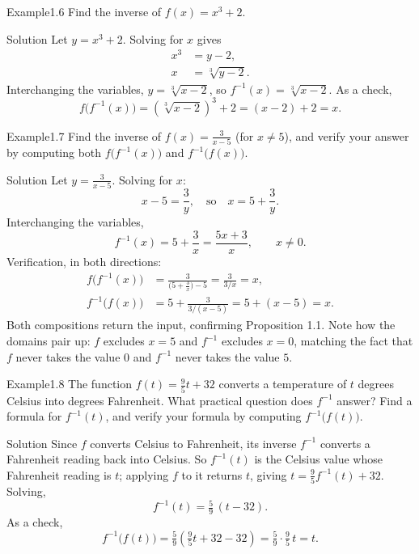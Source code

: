 \documentclass[a4paper,12pt,oneside]{memoir}
\begin{document}
\begin{workedexample}
\begin{envexample}{Example}{1.6}{}
Find the inverse of \(f(x) = x^{3} + 2\).
\end{envexample}
\begin{envsolution}{Solution}{}{}
Let \(y = x^{3} + 2\). Solving for \(x\) gives \[ \begin{aligned} x^{3} &= y - 2,\\ x &= \sqrt[3]{y - 2}. \end{aligned} \] Interchanging the variables, \(y = \sqrt[3]{x - 2}\), so \(f^{-1}(x) = \sqrt[3]{x - 2}\). As a check, \[ f\!\bigl(f^{-1}(x)\bigr) = \left(\sqrt[3]{x - 2}\right)^{3} + 2 = (x - 2) + 2 = x. \]
\end{envsolution}
\end{workedexample}
\begin{workedexample}
\begin{envexample}{Example}{1.7}{}
Find the inverse of \(f(x) = \frac{3}{x - 5}\) (for \(x \neq 5\)), and verify your answer by computing both \(f\!\bigl(f^{-1}(x)\bigr)\) and \(f^{-1}\!\bigl(f(x)\bigr)\).
\end{envexample}
\begin{envsolution}{Solution}{}{}
Let \(y = \frac{3}{x - 5}\). Solving for \(x\): \[ x - 5 = \frac{3}{y}, \quad\text{so}\quad x = 5 + \frac{3}{y}. \] Interchanging the variables, \[ f^{-1}(x) = 5 + \frac{3}{x} = \frac{5x + 3}{x}, \qquad x \neq 0. \] Verification, in both directions: \[ \begin{aligned} f\!\bigl(f^{-1}(x)\bigr) &= \frac{3}{\bigl(5 + \tfrac{3}{x}\bigr) - 5} = \frac{3}{3/x} = x, \\ f^{-1}\!\bigl(f(x)\bigr) &= 5 + \frac{3}{3/(x - 5)} = 5 + (x - 5) = x. \end{aligned} \] Both compositions return the input, confirming Proposition 1.1. Note how the domains pair up: \(f\) excludes \(x = 5\) and \(f^{-1}\) excludes \(x = 0\), matching the fact that \(f\) never takes the value \(0\) and \(f^{-1}\) never takes the value \(5\).
\end{envsolution}
\end{workedexample}
\begin{workedexample}
\begin{envexample}{Example}{1.8}{}
The function \(f(t) = \tfrac{9}{5} t + 32\) converts a temperature of \(t\) degrees Celsius into degrees Fahrenheit. What practical question does \(f^{-1}\) answer? Find a formula for \(f^{-1}(t)\), and verify your formula by computing \(f^{-1}\!\bigl(f(t)\bigr)\).
\end{envexample}
\begin{envsolution}{Solution}{}{}
Since \(f\) converts Celsius to Fahrenheit, its inverse \(f^{-1}\) converts a Fahrenheit reading back into Celsius. So \(f^{-1}(t)\) is the Celsius value whose Fahrenheit reading is \(t\); applying \(f\) to it returns \(t\), giving \(t = \tfrac{9}{5} f^{-1}(t) + 32\). Solving, \[ f^{-1}(t) = \tfrac{5}{9}\,(t - 32). \] As a check, \[ f^{-1}\!\bigl(f(t)\bigr) = \tfrac{5}{9}\!\left(\tfrac{9}{5} t + 32 - 32\right) = \tfrac{5}{9}\cdot\tfrac{9}{5}\,t = t. \]
\end{envsolution}
\end{workedexample}
\end{document}
